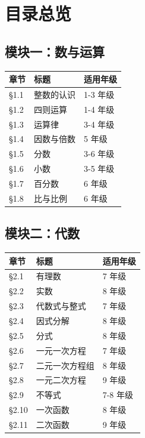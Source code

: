 \chapter*{目录总览}


\section*{模块一：数与运算}


\begin{center}
\begin{tabular}{lll}
\toprule
章节 & 标题 & 适用年级 \\
\midrule
§1.1 & 整数的认识 & 1-3 年级 \\
§1.2 & 四则运算 & 1-4 年级 \\
§1.3 & 运算律 & 3-4 年级 \\
§1.4 & 因数与倍数 & 5 年级 \\
§1.5 & 分数 & 3-6 年级 \\
§1.6 & 小数 & 3-5 年级 \\
§1.7 & 百分数 & 6 年级 \\
§1.8 & 比与比例 & 6 年级 \\
\bottomrule
\end{tabular}
\end{center}


\section*{模块二：代数}


\begin{center}
\begin{tabular}{lll}
\toprule
章节 & 标题 & 适用年级 \\
\midrule
§2.1 & 有理数 & 7 年级 \\
§2.2 & 实数 & 8 年级 \\
§2.3 & 代数式与整式 & 7 年级 \\
§2.4 & 因式分解 & 8 年级 \\
§2.5 & 分式 & 8 年级 \\
§2.6 & 一元一次方程 & 7 年级 \\
§2.7 & 二元一次方程组 & 8 年级 \\
§2.8 & 一元二次方程 & 9 年级 \\
§2.9 & 不等式 & 7-8 年级 \\
§2.10 & 一次函数 & 8 年级 \\
§2.11 & 二次函数 & 9 年级 \\
\bottomrule
\end{tabular}
\end{center}


